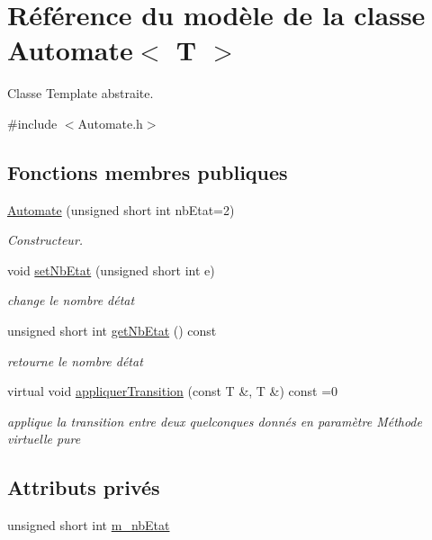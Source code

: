 \hypertarget{class_automate}{}\section{Référence du modèle de la classe Automate$<$ T $>$}
\label{class_automate}


Classe Template abstraite.  




{\ttfamily \#include $<$Automate.\+h$>$}

\subsection*{Fonctions membres publiques}
\begin{DoxyCompactItemize}
\item 
\hyperlink{class_automate_a3215065f896b7297a676219a0d80a045}{Automate} (unsigned short int nb\+Etat=2)
\begin{DoxyCompactList}\small\item\em Constructeur. \end{DoxyCompactList}\item 
void \hyperlink{class_automate_afcf89728c989465400a19174ef22dfa5}{set\+Nb\+Etat} (unsigned short int e)
\begin{DoxyCompactList}\small\item\em change le nombre d\textquotesingle{}état \end{DoxyCompactList}\item 
unsigned short int \hyperlink{class_automate_a80d9f6cfc6786ac21b51c4ab7fcb072d}{get\+Nb\+Etat} () const 
\begin{DoxyCompactList}\small\item\em retourne le nombre d\textquotesingle{}état \end{DoxyCompactList}\item 
virtual void \hyperlink{class_automate_abfeaddcc8930b1f63a785cd5c6ff6dc5}{appliquer\+Transition} (const T \&, T \&) const =0
\begin{DoxyCompactList}\small\item\em applique la transition entre deux quelconques donnés en paramètre Méthode virtuelle pure \end{DoxyCompactList}\end{DoxyCompactItemize}
\subsection*{Attributs privés}
\begin{DoxyCompactItemize}
\item 
unsigned short int \hyperlink{class_automate_aa3d97a653a0c0f20175237c03345d085}{m\+\_\+nb\+Etat}
\end{DoxyCompactItemize}


